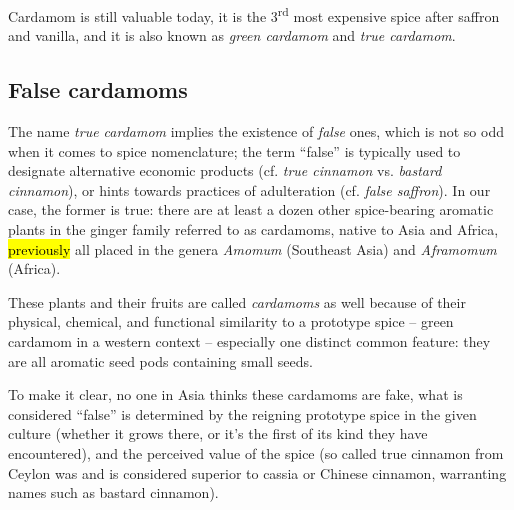 \documentclass[12pt]{article}
\begin{document}
Cardamom is still valuable today, it is the 3\textsuperscript{rd} most expensive spice after saffron and vanilla, and it is also known as \textit{green cardamom} and \textit{true cardamom}. 





\subsection{False cardamoms}

The name \textit{true cardamom} implies the existence of \textit{false} ones, which is not so odd when it comes to spice nomenclature; the term ``false'' is typically used to designate alternative economic products (cf. \textit{true cinnamon} vs. \textit{bastard cinnamon}), or hints towards practices of adulteration (cf. \textit{false saffron}). In our case, the former is true: there are at least a dozen other spice-bearing aromatic plants in the ginger family referred to as cardamoms, native to Asia and Africa, \hl{previously} all placed in the genera \textit{Amomum} (Southeast Asia) and \textit{Aframomum} (Africa). 


These plants and their fruits are called \textit{cardamoms} as well because of their physical, chemical, and functional similarity to a prototype spice -- green cardamom in a western context -- especially one distinct common feature: they are all aromatic seed pods containing small seeds.

To make it clear, no one in Asia thinks these cardamoms are fake, what is considered ``false'' is determined by the reigning prototype spice in the given culture (whether it grows there, or it's the first of its kind they have encountered), and the perceived value of the spice (so called true cinnamon from Ceylon was and is considered superior to cassia or Chinese cinnamon, warranting names such as bastard cinnamon).
\end{document}
